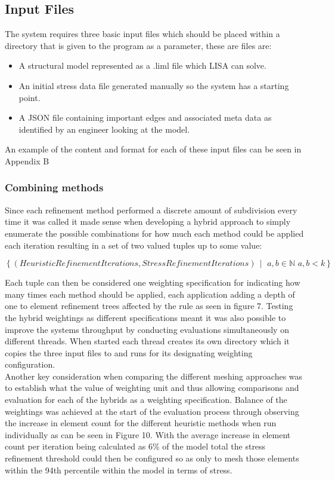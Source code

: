 \subsection{Input Files}
The system requires three basic input files which should be placed within a directory that is given to the program as a parameter, these are files are:

\begin{itemize}
\item A structural model represented as a .liml file which LISA can solve.
\item An initial stress data file generated manually so the system has a starting point.
\item A JSON file containing important edges and associated meta data as identified by an engineer looking at the model.
\end{itemize}

An example of the content and format for each of these input files can be seen in Appendix B


\subsubsection{Combining methods}
Since each refinement method performed a discrete amount of subdivision every time it was called it made sense when developing a hybrid approach to simply enumerate the possible combinations for how much each method could be applied each iteration resulting in a set of two valued tuples up to some value:

\[ \left\{ (HeuristicRefinementIterations, StressRefinementIterations) \,\middle|\, \, a,b \in \mathbb{N}\, \, a,b < k \right\} \]

\noindent
Each tuple can then be considered one weighting specification for indicating how many times each method should be applied, each application adding a depth of one to element refinement trees affected by the rule as seen in figure 7. Testing the hybrid weightings as different specifications meant it was also possible to improve the systems throughput by conducting evaluations simultaneously on different threads. When started each thread creates its own directory which it copies the three input files to and runs for its designating weighting configuration. \\

\noindent
Another key consideration when comparing the different meshing approaches was to establish what the value of weighting unit and thus allowing comparisons and evaluation for each of the hybrids as a weighting specification. Balance of the weightings was achieved at the start of the evaluation process through observing the increase in element count for the different heuristic methods when run individually as can be seen in Figure 10. With the average increase in element count per iteration being calculated as 6\% of the model total the stress refinement threshold could then be configured so as only to mesh those elements within the 94th percentile within the model in terms of stress. \\

